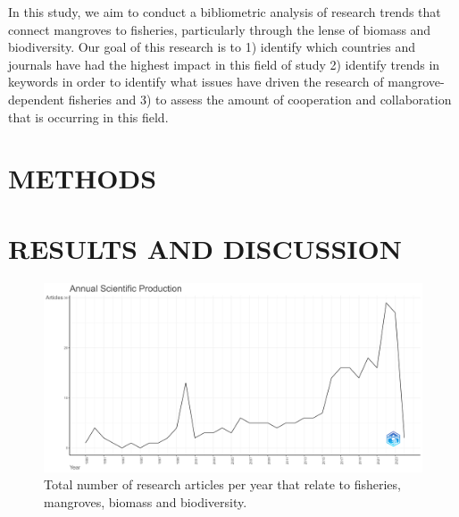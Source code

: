 \documentclass[
  12pt,
]{article}
\begin{document}
In this study, we aim to conduct a bibliometric analysis of research trends that connect mangroves to fisheries, particularly through the lense of biomass and biodiversity. Our goal of this research is to 1) identify which countries and journals have had the highest impact in this field of study 2) identify trends in keywords in order to identify what issues have driven the research of mangrove-dependent fisheries and 3) to assess the amount of cooperation and collaboration that is occurring in this field.

\hypertarget{methods}{%
\section{METHODS}\label{methods}}

\hypertarget{results-and-discussion}{%
\section{RESULTS AND DISCUSSION}\label{results-and-discussion}}

\begin{figure}
\includegraphics[width=1\linewidth]{AnnualScientificProduction} \caption{Total number of research articles per year that relate to fisheries, mangroves, biomass and biodiversity. \label{AnnualScientificProduction}}\label{fig:AnnualScientificProduction}
\end{figure}
\end{document}
